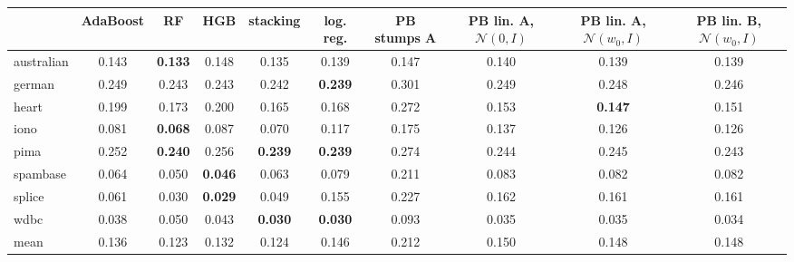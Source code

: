 \begin{tabular}{lccccccccc}
\toprule
 & AdaBoost & RF & HGB & stacking & log. reg. & PB stumps A & PB lin. A, $\mathcal{N}(0,I)$ & PB lin. A, $\mathcal{N}(w_0,I)$ & PB lin. B, $\mathcal{N}(w_0,I)$ \\
\midrule
australian & 0.143 & \textbf{0.133} & 0.148 & 0.135 & 0.139 & 0.147 & 0.140 & 0.139 & 0.139 \\
german & 0.249 & 0.243 & 0.243 & 0.242 & \textbf{0.239} & 0.301 & 0.249 & 0.248 & 0.246 \\
heart & 0.199 & 0.173 & 0.200 & 0.165 & 0.168 & 0.272 & 0.153 & \textbf{0.147} & 0.151 \\
iono & 0.081 & \textbf{0.068} & 0.087 & 0.070 & 0.117 & 0.175 & 0.137 & 0.126 & 0.126 \\
pima & 0.252 & \textbf{0.240} & 0.256 & \textbf{0.239} & \textbf{0.239} & 0.274 & 0.244 & 0.245 & 0.243 \\
spambase & 0.064 & 0.050 & \textbf{0.046} & 0.063 & 0.079 & 0.211 & 0.083 & 0.082 & 0.082 \\
splice & 0.061 & 0.030 & \textbf{0.029} & 0.049 & 0.155 & 0.227 & 0.162 & 0.161 & 0.161 \\
wdbc & 0.038 & 0.050 & 0.043 & \textbf{0.030} & \textbf{0.030} & 0.093 & 0.035 & 0.035 & 0.034 \\
mean & 0.136 & 0.123 & 0.132 & 0.124 & 0.146 & 0.212 & 0.150 & 0.148 & 0.148 \\
\bottomrule
\end{tabular}
